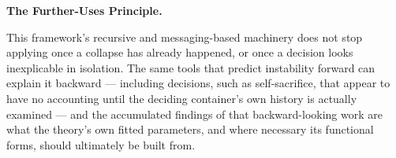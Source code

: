 \documentclass[
]{article}
\begin{document}
\textbf{The Further-Uses Principle.}

This framework's recursive and messaging-based machinery does not stop
applying once a collapse has already happened, or once a decision looks
inexplicable in isolation. The same tools that predict instability
forward can explain it backward --- including decisions, such as
self-sacrifice, that appear to have no accounting until the deciding
container's own history is actually examined --- and the accumulated
findings of that backward-looking work are what the theory's own fitted
parameters, and where necessary its functional forms, should ultimately
be built from.
\end{document}

